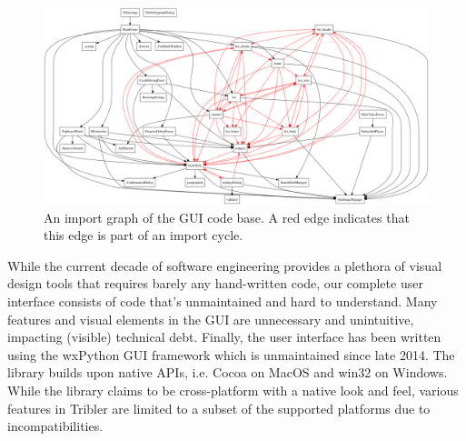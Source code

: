 \begin{figure}[!h]
	\centering
	\includegraphics[width=1.0\columnwidth]{images/problem_description/wx_cycles}
	\caption{An import graph of the GUI code base. A red edge indicates that this edge is part of an import cycle.}
	\label{fig:wx-import-graph}
\end{figure}

While the current decade of software engineering provides a plethora of visual design tools that requires barely any hand-written code, our complete user interface consists of code that's unmaintained and hard to understand. Many features and visual elements in the GUI are unnecessary and unintuitive, impacting (visible) technical debt. Finally, the user interface has been written using the wxPython GUI framework which is unmaintained since late 2014. The library builds upon native APIs, i.e. Cocoa on MacOS and win32 on Windows. While the library claims to be cross-platform with a native look and feel, various features in Tribler are limited to a subset of the supported platforms due to incompatibilities.

